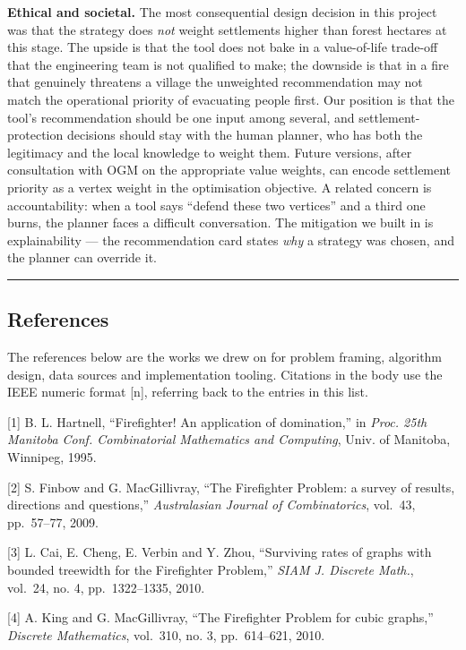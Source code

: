 \documentclass[
  11pt,
]{article}
\begin{document}
\textbf{Ethical and societal.} The most consequential design decision in
this project was that the strategy does \emph{not} weight settlements
higher than forest hectares at this stage. The upside is that the tool
does not bake in a value-of-life trade-off that the engineering team is
not qualified to make; the downside is that in a fire that genuinely
threatens a village the unweighted recommendation may not match the
operational priority of evacuating people first. Our position is that
the tool's recommendation should be one input among several, and
settlement-protection decisions should stay with the human planner, who
has both the legitimacy and the local knowledge to weight them. Future
versions, after consultation with OGM on the appropriate value weights,
can encode settlement priority as a vertex weight in the optimisation
objective. A related concern is accountability: when a tool says
``defend these two vertices'' and a third one burns, the planner faces a
difficult conversation. The mitigation we built in is explainability ---
the recommendation card states \emph{why} a strategy was chosen, and the
planner can override it.

\begin{center}\rule{0.5\linewidth}{0.5pt}\end{center}

\subsection{References}\label{references}

The references below are the works we drew on for problem framing,
algorithm design, data sources and implementation tooling. Citations in
the body use the IEEE numeric format {[}n{]}, referring back to the
entries in this list.

{[}1{]} B. L. Hartnell, ``Firefighter! An application of domination,''
in \emph{Proc. 25th Manitoba Conf. Combinatorial Mathematics and
Computing}, Univ. of Manitoba, Winnipeg, 1995.

{[}2{]} S. Finbow and G. MacGillivray, ``The Firefighter Problem: a
survey of results, directions and questions,'' \emph{Australasian
Journal of Combinatorics}, vol.~43, pp.~57--77, 2009.

{[}3{]} L. Cai, E. Cheng, E. Verbin and Y. Zhou, ``Surviving rates of
graphs with bounded treewidth for the Firefighter Problem,'' \emph{SIAM
J. Discrete Math.}, vol.~24, no. 4, pp.~1322--1335, 2010.

{[}4{]} A. King and G. MacGillivray, ``The Firefighter Problem for cubic
graphs,'' \emph{Discrete Mathematics}, vol.~310, no. 3, pp.~614--621,
2010.
\end{document}

